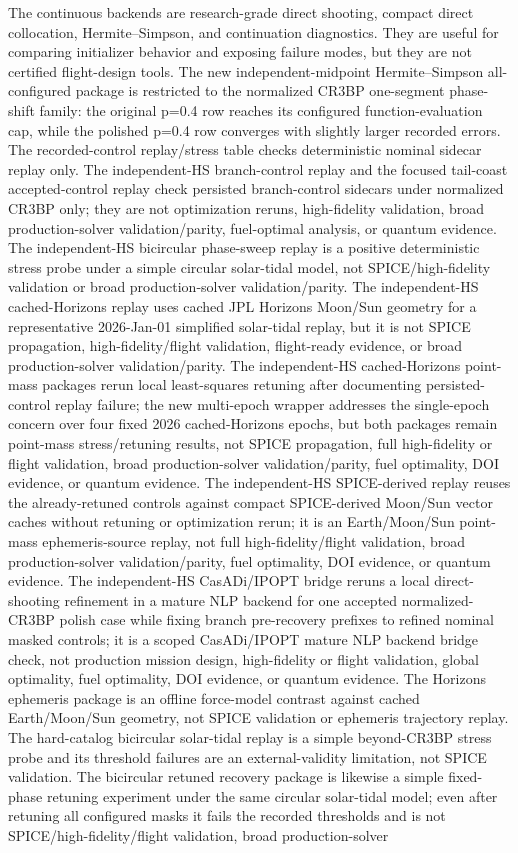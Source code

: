 \documentclass[preprint,12pt]{elsarticle}
\begin{document}
The continuous backends are research-grade direct shooting, compact direct collocation, Hermite--Simpson, and continuation diagnostics. They are useful for comparing initializer behavior and exposing failure modes, but they are not certified flight-design tools. The new independent-midpoint Hermite--Simpson all-configured package is restricted to the normalized CR3BP one-segment phase-shift family: the original p=0.4 row reaches its configured function-evaluation cap, while the polished p=0.4 row converges with slightly larger recorded errors. The recorded-control replay/stress table checks deterministic nominal sidecar replay only. The independent-HS branch-control replay and the focused tail-coast accepted-control replay check persisted branch-control sidecars under normalized CR3BP only; they are not optimization reruns, high-fidelity validation, broad production-solver validation/parity, fuel-optimal analysis, or quantum evidence. The independent-HS bicircular phase-sweep replay is a positive deterministic stress probe under a simple circular solar-tidal model, not SPICE/high-fidelity validation or broad production-solver validation/parity. The independent-HS cached-Horizons replay uses cached JPL Horizons Moon/Sun geometry for a representative 2026-Jan-01 simplified solar-tidal replay, but it is not SPICE propagation, high-fidelity/flight validation, flight-ready evidence, or broad production-solver validation/parity. The independent-HS cached-Horizons point-mass packages rerun local least-squares retuning after documenting persisted-control replay failure; the new multi-epoch wrapper addresses the single-epoch concern over four fixed 2026 cached-Horizons epochs, but both packages remain point-mass stress/retuning results, not SPICE propagation, full high-fidelity or flight validation, broad production-solver validation/parity, fuel optimality, DOI evidence, or quantum evidence. The independent-HS SPICE-derived replay reuses the already-retuned controls against compact SPICE-derived Moon/Sun vector caches without retuning or optimization rerun; it is an Earth/Moon/Sun point-mass ephemeris-source replay, not full high-fidelity/flight validation, broad production-solver validation/parity, fuel optimality, DOI evidence, or quantum evidence. The independent-HS CasADi/IPOPT bridge reruns a local direct-shooting refinement in a mature NLP backend for one accepted normalized-CR3BP polish case while fixing branch pre-recovery prefixes to refined nominal masked controls; it is a scoped CasADi/IPOPT mature NLP backend bridge check, not production mission design, high-fidelity or flight validation, global optimality, fuel optimality, DOI evidence, or quantum evidence. The Horizons ephemeris package is an offline force-model contrast against cached Earth/Moon/Sun geometry, not SPICE validation or ephemeris trajectory replay. The hard-catalog bicircular solar-tidal replay is a simple beyond-CR3BP stress probe and its threshold failures are an external-validity limitation, not SPICE validation. The bicircular retuned recovery package is likewise a simple fixed-phase retuning experiment under the same circular solar-tidal model; even after retuning all configured masks it fails the recorded thresholds and is not SPICE/high-fidelity/flight validation, broad production-solver 
\end{document}
